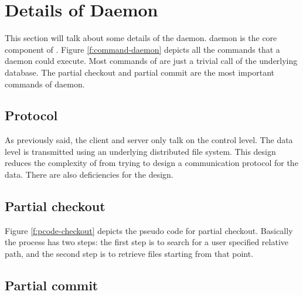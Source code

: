 \section{Details of \Sys Daemon}
\label{s:daemon}



This section will talk about some details of the \sys daemon. \Sys daemon is the
core component of \sys. Figure \ref{f:command-daemon} depicts all the commands
that a \sys daemon could execute. Most commands of \sys are just a trivial call
of the underlying \git database. The partial checkout and partial commit are the
most important commands of \sys daemon.

\subsection{Protocol}

As previously said,
the client and server only talk on the control level. The data level is
transmitted using an underlying distributed file system. This design reduces the
complexity of \sys from trying to design a communication protocol for the data.
There are also deficiencies for the design. 


\subsection{Partial checkout}



Figure \ref{f:pcode-checkout} depicts the pseudo code for partial checkout.
Basically the process has two steps: the first step is to search for a user
specified relative path, and the second step is to retrieve files starting from
that point. 

\subsection{Partial commit}


